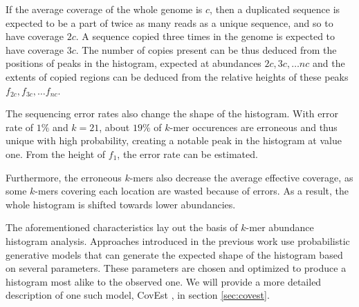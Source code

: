 \medskip

If the average coverage of the whole genome is $c$, then a duplicated sequence is expected 
to be a part of twice as many reads as a unique sequence, and so to have coverage $2c$. 
A sequence copied three times in the genome is expected to have coverage $3c$.
The number of copies present can be thus deduced from the positions of peaks in the histogram,
expected at abundances $2c, 3c, \dots nc$ and the extents of copied regions can be deduced
from the relative heights of these peaks $f_{2c}, f_{3c}, \dots f_{nc}$.

\medskip
 
The sequencing error rates also change the shape of the histogram. With error rate of $1\%$ 
and $k=21$, about $19\%$ of $k$-mer occurences are erroneous and thus unique with high probability, 
creating a notable peak in the histogram at value one. From the height of $f_1$, the error rate
can be estimated. 

Furthermore, the erroneous $k$-mers also decrease the average effective coverage,
as some $k$-mers covering each location are wasted because of errors. As a result, the whole
histogram is shifted towards lower abundancies.

\medskip

The aforementioned characteristics lay out the basis of $k$-mer abundance histogram analysis.
Approaches introduced in the previous work \cite{Hozza2015, Williams2013, Melsted2014,
Sivadasan2016} use probabilistic generative models that can generate the
expected shape of the histogram based on several parameters. These parameters are chosen
and optimized to produce a histogram most alike to the observed one.
We will provide a more detailed description of one such model, CovEst \cite{Hozza2015, Hozza2016},
in section \ref{sec:covest}.
